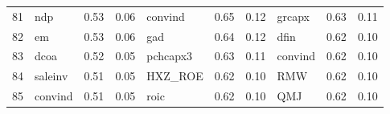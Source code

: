 \documentclass[12pt]{article}
\begin{document}
\begin{landscape}
\begin{footnotesize}
\begin{longtable}{l|lcc|lcc|lcc}
			81                    & ndp                         & 0.53                                                                                 & 0.06                            & convind                     & 0.65                                                                                 & 0.12                            & grcapx                      & 0.63                                                                                 & 0.11                           \\
			82                    & em                          & 0.53                                                                                 & 0.06                            & gad                         & 0.64                                                                                 & 0.12                            & dfin                        & 0.62                                                                                 & 0.10                           \\
			83                    & dcoa                        & 0.52                                                                                 & 0.05                            & pchcapx3                    & 0.63                                                                                 & 0.11                            & convind                     & 0.62                                                                                 & 0.10                           \\
			84                    & saleinv                     & 0.51                                                                                 & 0.05                            & HXZ\_ROE                    & 0.62                                                                                 & 0.10                            & RMW                         & 0.62                                                                                 & 0.10                           \\
			85                    & convind                     & 0.51                                                                                 & 0.05                            & roic                        & 0.62                                                                                 & 0.10                            & QMJ                         & 0.62                                                                                 & 0.10                           \\

\end{longtable}
\end{footnotesize}
\end{landscape}
\end{document}
